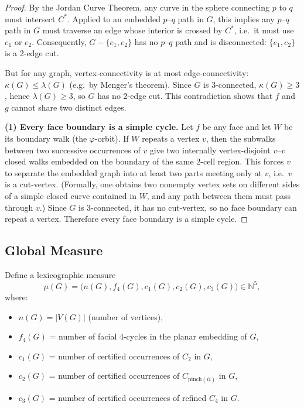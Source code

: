 \documentclass[12pt]{article}
\theoremstyle{definition}
\begin{document}
\begin{proof}
By the Jordan Curve Theorem, any curve in the sphere connecting $p$ to $q$ must intersect $C^*$.
Applied to an embedded $p$--$q$ path in $G$, this implies any $p$--$q$ path in $G$ must traverse
an edge whose interior is crossed by $C^*$, i.e.\ it must use $e_1$ or $e_2$.
Consequently, $G-\{e_1,e_2\}$ has no $p$--$q$ path and is disconnected: $\{e_1,e_2\}$ is a 2-edge cut.

But for any graph, vertex-connectivity is at most edge-connectivity:
$\kappa(G)\le \lambda(G)$ (e.g.\ by Menger’s theorem).
Since $G$ is 3-connected, $\kappa(G)\ge 3$, hence $\lambda(G)\ge 3$, so $G$ has no 2-edge cut.
This contradiction shows that $f$ and $g$ cannot share two distinct edges.

\medskip
\noindent\textbf{(1) Every face boundary is a simple cycle.}
Let $f$ be any face and let $W$ be its boundary walk (the $\varphi$-orbit).
If $W$ repeats a vertex $v$, then the subwalks between two successive occurrences of $v$
give two internally vertex-disjoint $v$--$v$ closed walks embedded on the boundary of the same
2-cell region. This forces $v$ to separate the embedded graph into at least two parts meeting only at $v$,
i.e.\ $v$ is a cut-vertex. (Formally, one obtains two nonempty vertex sets on different sides of a simple
closed curve contained in $W$, and any path between them must pass through $v$.)
Since $G$ is 3-connected, it has no cut-vertex, so no face boundary can repeat a vertex.
Therefore every face boundary is a simple cycle.
\end{proof}

\subsection{Global Measure}
\label{sec:measure}

Define a lexicographic measure
\[
\mu(G) = \bigl(n(G), f_4(G), c_1(G), c_2(G), c_3(G)\bigr) \in \mathbb{N}^5,
\]
where:
\begin{itemize}
    \item $n(G) = |V(G)|$ (number of vertices),
    \item $f_4(G)$ = number of facial 4-cycles in the planar embedding of $G$,
    \item $c_1(G)$ = number of certified occurrences of $C_2$ in $G$,
    \item $c_2(G)$ = number of certified occurrences of $C_{\text{pinch}(ii)}$ in $G$,
    \item $c_3(G)$ = number of certified occurrences of refined $C_4$ in $G$.
\end{itemize}
\end{document}
